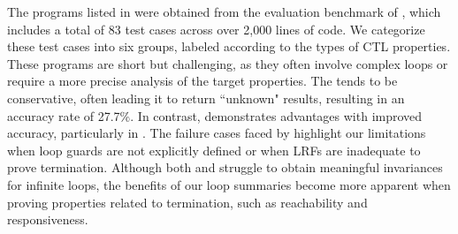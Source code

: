 The programs listed in  were obtained from the evaluation benchmark of \function, which includes a total of 83 test cases across over 2,000 lines of code. We categorize these test cases into six groups, labeled according to the types of CTL properties. 
These programs are short but challenging, as they often involve complex loops or require a more precise analysis of the target properties. The \function tends to be conservative, often leading it to return ``unknown" results, resulting in an accuracy rate of 27.7\%. In contrast, \toolName demonstrates advantages with improved accuracy, particularly in \ourToolSmallBenchmark. 
The failure cases faced by \toolName highlight our limitations when loop guards are not explicitly defined or when LRFs are inadequate to prove termination. 
Although both \function and \toolName struggle to obtain meaningful invariances for infinite loops, the benefits of our loop summaries become more apparent when proving properties related to termination, such as reachability and responsiveness.  




